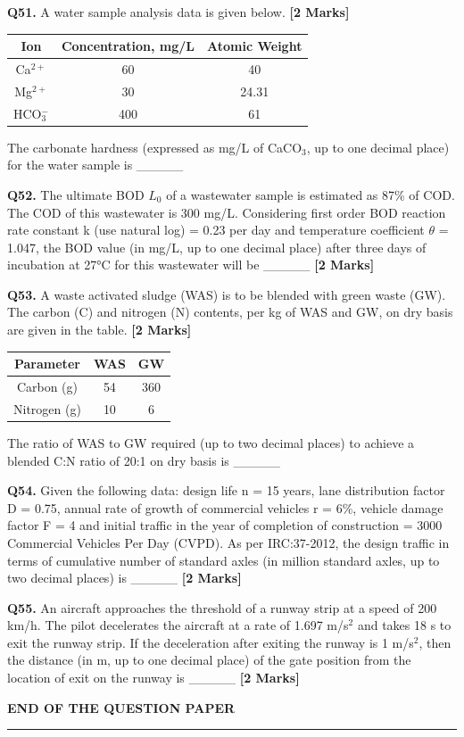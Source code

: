 \documentclass[11pt]{article}
\newcommand{\questionb}[2]{
    \noindent\textbf{Q#2.} #1 \hfill \textbf{[2 Marks]}
}
\begin{document}
\questionb{A water sample analysis data is given below.}{51}

\begin{tabular}{|c|c|c|}
\hline
Ion & Concentration, mg/L & Atomic Weight \\
\hline
Ca\(^{2+}\) & 60 & 40 \\
Mg\(^{2+}\) & 30 & 24.31 \\
HCO\(_3^-\) & 400 & 61 \\
\hline
\end{tabular}

The carbonate hardness (expressed as mg/L of CaCO\(_3\), up to one decimal place) for the water sample is \_\_\_\_\_
\vspace{0.5cm}

\questionb{The ultimate BOD \( L_0 \) of a wastewater sample is estimated as 87\% of COD. The COD of this wastewater is 300 mg/L. Considering first order BOD reaction rate constant k (use natural log) = 0.23 per day and temperature coefficient $\theta$ = 1.047, the BOD value (in mg/L, up to one decimal place) after three days of incubation at 27°C for this wastewater will be \_\_\_\_\_}{52}
\vspace{0.5cm}

\questionb{A waste activated sludge (WAS) is to be blended with green waste (GW). The carbon (C) and nitrogen (N) contents, per kg of WAS and GW, on dry basis are given in the table.}{53}

\begin{tabular}{|c|c|c|}
\hline
Parameter & WAS & GW \\
\hline
Carbon (g) & 54 & 360 \\
Nitrogen (g) & 10 & 6 \\
\hline
\end{tabular}

The ratio of WAS to GW required (up to two decimal places) to achieve a blended C:N ratio of 20:1 on dry basis is \_\_\_\_\_
\vspace{0.5cm}

\questionb{Given the following data: design life n = 15 years, lane distribution factor D = 0.75, annual rate of growth of commercial vehicles r = 6\%, vehicle damage factor F = 4 and initial traffic in the year of completion of construction = 3000 Commercial Vehicles Per Day (CVPD). As per IRC:37-2012, the design traffic in terms of cumulative number of standard axles (in million standard axles, up to two decimal places) is \_\_\_\_\_}{54}
\vspace{0.5cm}

\questionb{An aircraft approaches the threshold of a runway strip at a speed of 200 km/h. The pilot decelerates the aircraft at a rate of 1.697 m/s\(^2\) and takes 18 s to exit the runway strip. If the deceleration after exiting the runway is 1 m/s\(^2\), then the distance (in m, up to one decimal place) of the gate position from the location of exit on the runway is \_\_\_\_\_}{55}
\vspace{1 cm}

\begin{center}
\textbf{END OF THE QUESTION PAPER}
\rule{\textwidth}{0.5pt}
\end{center}
\end{document}
